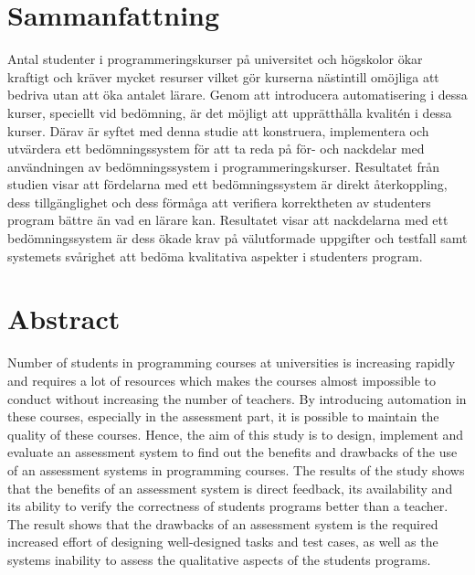 \documentclass[a4paper,11pt]{article}
\begin{document}
{\newpage

\mbox{}

\newpage

\section*{Sammanfattning}

Antal studenter i programmeringskurser på universitet och högskolor ökar kraftigt och kräver mycket resurser vilket gör kurserna nästintill omöjliga att bedriva utan att öka antalet lärare. Genom att introducera automatisering i dessa kurser, speciellt vid bedömning, är det möjligt att upprätthålla kvalitén i dessa kurser. Därav är syftet med denna studie att konstruera, implementera och utvärdera ett bedömningssystem för att ta reda på för- och nackdelar med användningen av bedömningssystem i programmeringskurser. Resultatet från studien visar att fördelarna med ett bedömningssystem är direkt återkoppling, dess tillgänglighet och dess förmåga att verifiera korrektheten av studenters program bättre än vad en lärare kan. Resultatet visar att nackdelarna med ett bedömningssystem är dess ökade krav på välutformade uppgifter och testfall samt systemets svårighet att bedöma kvalitativa aspekter i studenters program.

\newpage

\mbox{}

\newpage

\section*{Abstract}

Number of students in programming courses at universities is increasing rapidly and requires a lot of resources which makes the courses almost impossible to conduct without increasing the number of teachers. By introducing automation in these courses, especially in the assessment part, it is possible to maintain the quality of these courses. Hence, the aim of this study is to design, implement and evaluate an assessment system to find out the benefits and drawbacks of the use of an assessment systems in programming courses. The results of the study shows that the benefits of an assessment system is direct feedback, its availability and its ability to verify the correctness of students programs better than a teacher. The result shows that the drawbacks of an assessment system is the required increased effort of designing well-designed tasks and test cases, as well as the systems inability to assess the qualitative aspects of the students programs.

}
\end{document}
